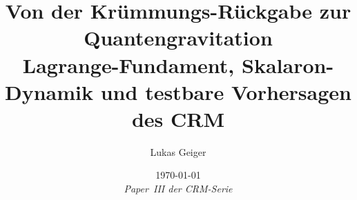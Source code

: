 \documentclass[11pt,a4paper]{article}
\begin{document}
\sloppy


\title{\textbf{\huge Von der Kr\"ummungs-R\"uckgabe zur Quantengravitation}\\[0.5em]
\Large Lagrange-Fundament, Skalaron-Dynamik und testbare Vorhersagen des CRM}

\author[1]{Lukas Geiger}

\date{\today \\ \vspace{0.5em} \small \textit{Paper~III der CRM-Serie \cite{Geiger2026,Geiger2026b}}}

\maketitle
\end{document}
